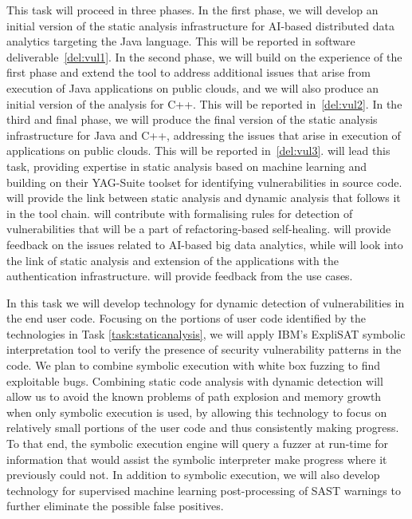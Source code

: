 \begin{Workpackage}{\thewpno}
\begin{Task}
\taskbreak
This task will proceed in three phases. In the first phase, we will develop an initial version of the static analysis infrastructure for AI-based distributed data analytics targeting the Java language. This will be reported in software deliverable~\ref{del:vul1}. In the second phase, we will build on the experience of the first phase and extend the tool to address additional issues that arise from execution of Java applications on public clouds, and we will also produce an initial version of the analysis for C++. This will be reported in~\ref{del:vul2}. In the third and final phase, we will produce the final version of the static analysis infrastructure for Java and C++, addressing the issues that arise in execution of applications on public clouds. This will be reported in~\ref{del:vul3}. \YAGshort{} will lead this task, providing expertise in static analysis based on machine learning and building on their YAG-Suite toolset for identifying vulnerabilities in source code. \IBMshort{} will provide the link between static analysis and dynamic analysis that follows it in the \TheProject{} tool chain. \SAshort{} will contribute with formalising rules for detection of vulnerabilities that will be a part of refactoring-based self-healing. \UODshort{} will provide feedback on the issues related to AI-based big data analytics, while \COGNIshort{} will look into the link of static analysis and extension of the applications with the authentication infrastructure. \SOPRAshort{} will provide feedback from the use cases.


\end{Task}

\begin{Task}
\TaskResults{%
\ref{del:vul1},
\ref{del:vul2},
\ref{del:vul3}
}
\TaskHeader{}
In this task we will develop technology for dynamic detection of vulnerabilities in the end user code. Focusing on the portions of user code identified by the technologies in Task \ref{task:staticanalysis}, we will apply IBM's ExpliSAT symbolic interpretation tool to verify the presence of security vulnerability patterns in the code. We plan to combine symbolic execution with white box fuzzing to find exploitable bugs. Combining static code analysis with dynamic detection will allow us to avoid the known problems of path explosion and memory growth when only symbolic execution is used, by allowing this technology to focus on relatively small portions of the user code and thus consistently making progress. To that end, the symbolic execution engine will query a fuzzer at run-time for information that would assist the symbolic interpreter make progress where it previously could not. In addition to symbolic execution, we will also develop technology for supervised machine learning post-processing of SAST warnings to further eliminate the possible false positives. 


\end{Task}
\end{Workpackage}
